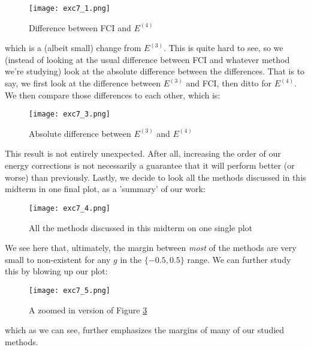 \documentclass{article}
\begin{document}
\newline
\begin{figure}[ht!]
    \centering
    \texttt{[image: exc7\_1.png]}
    \caption{Difference between FCI and $E^{(4)}$}
    \label{fig:enter-label}
\end{figure}
\newline
which is a (albeit small) change from $E^{(3)}$. This is quite hard to see, so we (instead of looking at the usual difference between FCI and whatever method we're studying) look at the absolute difference between the differences. That is to say, we first look at the difference between $E^{(3)}$ and FCI, then ditto for $E^{(4)}$. We then compare those differences to each other, which is:
\begin{figure}[ht!]
    \centering
    \texttt{[image: exc7\_3.png]}
    \caption{Absolute difference between $E^{(3)}$ and $E^{(4)}$}
    \label{fig:enter-label}
\end{figure}
\newline
This result is not entirely unexpected. After all, increasing the order of our energy corrections is not necessarily a guarantee that it will perform better (or worse) than previously.
\newpage
Lastly, we decide to look all the methods discussed in this midterm in one final plot, as a 'summary' of our work:
\begin{figure}[ht!]
    \centering
    \texttt{[image: exc7\_4.png]}
    \caption{All the methods discussed in this midterm on one single plot}
    \label{figall}
\end{figure}
We see here that, ultimately, the margin between \emph{most} of the methods are very small to non-existent for any $g$ in the $\{-0.5, 0.5\}$ range. We can further study this by blowing up our plot:
\begin{figure}[ht!]
    \centering
    \texttt{[image: exc7\_5.png]}
    \caption{A zoomed in version of Figure \ref{figall}}
    \label{fig:enter-label}
\end{figure}
which as we can see, further emphasizes the margins of many of our studied methods.
\newline
\end{document}

